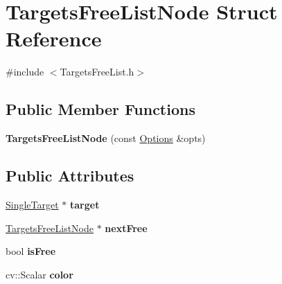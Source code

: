 \hypertarget{structTargetsFreeListNode}{}\section{Targets\+Free\+List\+Node Struct Reference}
\label{structTargetsFreeListNode}


{\ttfamily \#include $<$Targets\+Free\+List.\+h$>$}

\subsection*{Public Member Functions}
\begin{DoxyCompactItemize}
\item 
\hypertarget{structTargetsFreeListNode_a284166a631a189cc0334638d0efe53a6}{}{\bfseries Targets\+Free\+List\+Node} (const \hyperlink{structOptions}{Options} \&opts)\label{structTargetsFreeListNode_a284166a631a189cc0334638d0efe53a6}

\end{DoxyCompactItemize}
\subsection*{Public Attributes}
\begin{DoxyCompactItemize}
\item 
\hypertarget{structTargetsFreeListNode_a4bf1b8d2ee5e3246617e4d19ddf3be59}{}\hyperlink{classSingleTarget}{Single\+Target} $\ast$ {\bfseries target}\label{structTargetsFreeListNode_a4bf1b8d2ee5e3246617e4d19ddf3be59}

\item 
\hypertarget{structTargetsFreeListNode_aebb8068d83b31f62286dae8a0397694a}{}\hyperlink{structTargetsFreeListNode}{Targets\+Free\+List\+Node} $\ast$ {\bfseries next\+Free}\label{structTargetsFreeListNode_aebb8068d83b31f62286dae8a0397694a}

\item 
\hypertarget{structTargetsFreeListNode_a3b6838264c70e578fe8958903359788e}{}bool {\bfseries is\+Free}\label{structTargetsFreeListNode_a3b6838264c70e578fe8958903359788e}

\item 
\hypertarget{structTargetsFreeListNode_a03f3c4cd1c023cf4571d37fe5b85cd94}{}cv\+::\+Scalar {\bfseries color}\label{structTargetsFreeListNode_a03f3c4cd1c023cf4571d37fe5b85cd94}

\end{DoxyCompactItemize}


